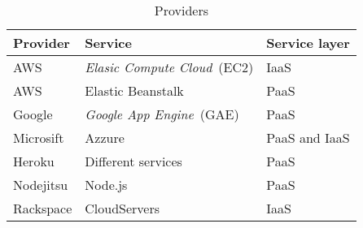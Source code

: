 \begin{table}
  \begin{tabular}{ | l | l | l | }
    \hline
    \textbf{Provider} & \textbf{Service} & \textbf{Service layer} \\ \hline
    AWS & \emph{Elasic Compute Cloud}~(EC2) & IaaS \\ \hline
    AWS & Elastic Beanstalk & PaaS \\ \hline
    Google & \emph{Google App Engine}~(GAE) & PaaS \\ \hline
    Microsift & Azzure & PaaS and IaaS \\ \hline
    Heroku & Different services & PaaS \\ \hline
    Nodejitsu & Node.js & PaaS \\ \hline
    Rackspace & CloudServers & IaaS \\ \hline
  \end{tabular}
  \caption{Providers}
  \label{table:providers}
\end{table}

